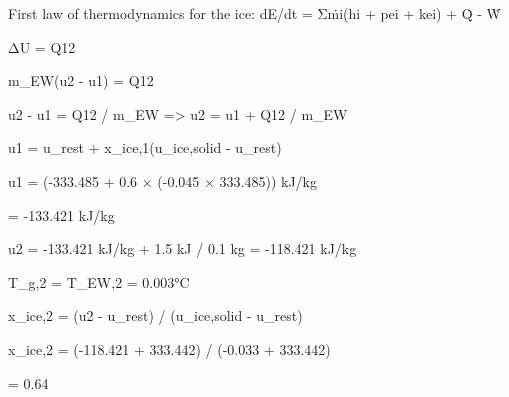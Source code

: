 First law of thermodynamics for the ice:  
dE/dt = Σṁi(hi + pei + kei) + Q̇ - Ẇ  

ΔU = Q12  

m_EW(u2 - u1) = Q12  

u2 - u1 = Q12 / m_EW => u2 = u1 + Q12 / m_EW  

u1 = u_rest + x_ice,1(u_ice,solid - u_rest)  

u1 = (-333.485 + 0.6 × (-0.045 × 333.485)) kJ/kg  

= -133.421 kJ/kg  

u2 = -133.421 kJ/kg + 1.5 kJ / 0.1 kg = -118.421 kJ/kg  

T_g,2 = T_EW,2 = 0.003°C  

x_ice,2 = (u2 - u_rest) / (u_ice,solid - u_rest)  

x_ice,2 = (-118.421 + 333.442) / (-0.033 + 333.442)  

= 0.64